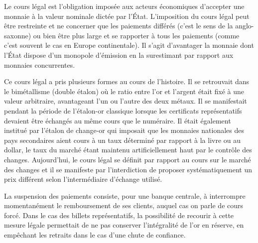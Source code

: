 Le cours légal est l'obligation imposée aux acteurs économiques d'accepter une monnaie à la valeur nominale dictée par l'État. L'imposition du cours légal peut être restreinte et ne concerner que les paiements différés (c'est le sens de la  anglo-saxonne) ou bien être plus large et se rapporter à tous les paiements (comme c'est souvent le cas en Europe continentale). Il s'agit d'avantager la monnaie dont l'État dispose d'un monopole d'émission en la surestimant par rapport aux monnaies concurrentes.

Ce cours légal a pris plusieurs formes au cours de l'histoire. Il se retrouvait dans le bimétallisme (double étalon) où le ratio entre l'or et l'argent était fixé à une valeur arbitraire, avantageant l'un ou l'autre des deux métaux. Il se manifestait pendant la période de l'étalon-or classique lorsque les certificats représentatifs devaient être échangés au même cours que le numéraire. Il était également institué par l'étalon de change-or qui imposait que les monnaies nationales des pays secondaires aient cours à un taux déterminé par rapport à la livre ou au dollar, le taux du marché étant maintenu artificiellement haut par le contrôle des changes. Aujourd'hui, le cours légal se définit par rapport au cours sur le marché des changes et il se manifeste par l'interdiction de proposer systématiquement un prix différent selon l'intermédiaire d'échange utilisé. %

La suspension des paiements consiste, pour une banque centrale, à interrompre momentanément le remboursement de ses clients, auquel cas on parle de cours forcé. Dans le cas des billets représentatifs, la possibilité de recourir à cette mesure légale permettait de ne pas conserver l'intégralité de l'or en réserve, en empêchant les retraits dans le cas d'une chute de confiance.


